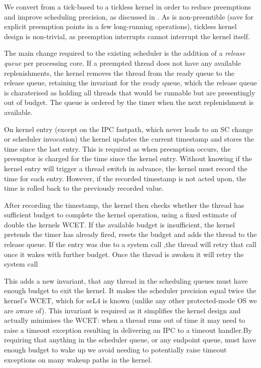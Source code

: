 We convert \selfour from a tick-based to a tickless kernel in order to reduce preemptions and
improve scheduling precision, as discussed in .
As \selfour is non-preemtible (save for explicit preemption points in a few long-running
operations), tickless kernel design is non-trivial, as preemption interrupts cannot interrupt the
kernel itself.

The main change required to the existing scheduler is the addition of a \emph{release queue} per
processing core. If a
preempted thread does not have any available replenishments, the kernel removes the thread from the
ready queue to the release queue, retaining the invariant for the ready queue, which the release
queue is charaterised as holding all threads that would be runnable but are presentingly out of
budget. The queue is ordered by the timer when the next replenishment is available.

On kernel entry (except on the IPC fastpath, which never leads to an SC
change or scheduler invocation) the kernel updates the current
timestamp and stores the time since the last entry. This is required as when preemption occurs, the
preemptor is charged for the time since the kernel entry. Without knowing if the kernel entry will
trigger a thread switch in advance, the kernel must record the time for each entry. However, if the
recorded timestamp is not acted upon, the time is rolled back to the previously recorded value.

After recording the timestamp, the kernel then checks
whether the thread has sufficient budget to complete the kernel
operation, using a fixed estimate of double the kernels \gls{WCET}.
If the available budget is insufficient, the kernel pretends the timer has already fired,
resets the budget and adds the thread to the release queue. If the entry was due to a system call
,the thread will retry that call once it wakes with further budget.
Once the thread is awoken it will retry the system call

This adds a new
invariant, that any thread in the scheduling queues must have enough budget to exit the kernel.
It makes the scheduler precision equal twice the kernel's WCET, which for
seL4 is known (unlike any other protected-mode OS we are aware of).
This invariant is required as it simplifies the kernel design and actually minimises the WCET: when
a
thread runs out of time it may need to raise a timeout exception resulting in delivering an IPC to a
timeout handler.By requiring that anything in the scheduler queue, or any endpoint queue, must have
enough budget to wake up we avoid needing to potentially raise timeout exceptions on many wakeup
paths in the kernel.

